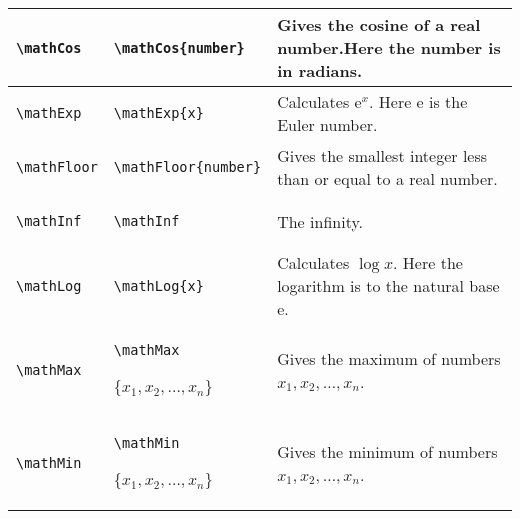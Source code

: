 \documentclass{article}
\begin{document}
\begin{center}
\begin{longtable}{llm{6cm}}
\midrule
\begin{lstlisting}
\mathCos
\end{lstlisting} &
\begin{lstlisting}
\mathCos{number}
\end{lstlisting} & Gives the cosine of a real number.Here the number is in radians.\\
\midrule
\begin{lstlisting}
\mathExp
\end{lstlisting} &
\begin{lstlisting}
\mathExp{x}
\end{lstlisting} & Calculates \(\mathrm{e}^x \). Here \(\mathrm{e} \) is the Euler number.\\
\midrule
\begin{lstlisting}
\mathFloor
\end{lstlisting} &
\begin{lstlisting}
\mathFloor{number}
\end{lstlisting} & Gives the smallest integer less than or equal to a real number.\\
\midrule
\begin{lstlisting}
\mathInf
\end{lstlisting} & \begin{lstlisting}
\mathInf
\end{lstlisting} & The infinity.\\
\midrule
\begin{lstlisting}
\mathLog
\end{lstlisting} &
\begin{lstlisting}
\mathLog{x}
\end{lstlisting} & Calculates \(\log x \). Here the logarithm is to the natural base \(\mathrm{e} \).\\
\midrule
\begin{lstlisting}
\mathMax
\end{lstlisting} &
\begin{lstlisting}
\mathMax\end{lstlisting}\{\(x_1,x_2,\ldots,x_n\)\}
 & Gives the maximum of numbers \(x_1,x_2,\ldots,x_n\).\\
\midrule
\begin{lstlisting}
\mathMin
\end{lstlisting} &
\begin{lstlisting}
\mathMin\end{lstlisting}\{\(x_1,x_2,\ldots,x_n\)\}
 & Gives the minimum of numbers \(x_1,x_2,\ldots,x_n\).\\

\end{longtable}
\end{center}
\end{document}
